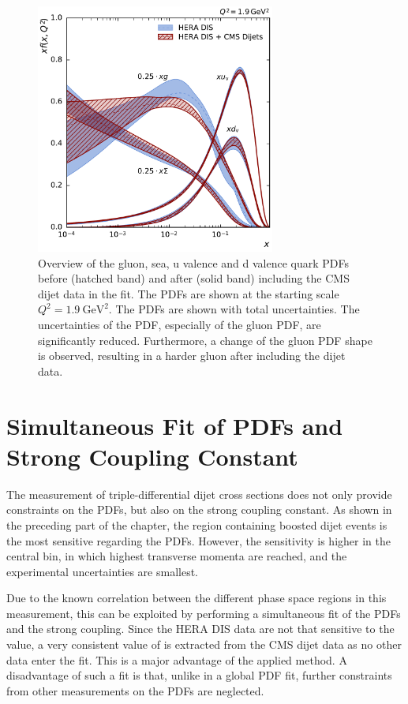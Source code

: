 \begin{figure}[tbp]
  \centering
  \includegraphics[width=0.7\textwidth]{figures/pdf_constraints/pdfcomp_direct_overview_1.9.pdf}\hfill%
  \caption[Overview of gluon and quark PDFs]{Overview of the gluon, sea, u
  valence and d valence quark PDFs before (hatched band) and after (solid band)
  including the CMS dijet data in the fit. The PDFs are shown at the starting
  scale $Q^2 = \SI{1.9}{\GeV \squared}$. The PDFs are shown with total
  uncertainties. The uncertainties of the PDF, especially of the gluon PDF, are
  significantly reduced. Furthermore, a change of the gluon PDF shape is observed, resulting in a
  harder gluon after including the dijet data.}
  \label{fig:pdfconstraints:overview:19}
\end{figure}

\section{Simultaneous Fit of PDFs and Strong Coupling Constant}

The measurement of triple-differential dijet cross sections does not only
provide constraints on the PDFs, but also on the strong coupling constant. As
shown in the preceding part of the chapter, the region containing boosted dijet events is
the most sensitive regarding the PDFs. However, the \as sensitivity is higher in
the central bin, in which highest transverse momenta are reached, and the
experimental uncertainties are smallest.

Due to the known correlation between the different phase space regions in this
measurement, this can be exploited by performing a simultaneous fit of the PDFs and the
strong coupling. Since the HERA DIS data are not that sensitive
to the \asmz value, a very consistent value of \asmz is extracted from the CMS
dijet data as no other data enter the fit. This is a major advantage of the
applied method. A disadvantage of such a fit is that, unlike in a global PDF fit, further
constraints from other measurements on the PDFs are neglected. 

